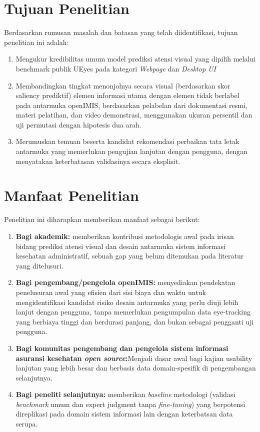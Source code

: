 \section{Tujuan Penelitian}


Berdasarkan rumusan masalah dan batasan yang telah diidentifikasi, tujuan penelitian ini adalah:

\begin{enumerate}
  \item Mengukur kredibilitas umum model prediksi atensi visual yang dipilih melalui benchmark publik UEyes pada kategori \textit{Webpage} dan \textit{Desktop UI}
  \item Membandingkan tingkat menonjolnya secara visual (berdasarkan skor saliency prediktif) elemen informasi utama dengan elemen tidak berlabel pada antarmuka openIMIS, berdasarkan pelabelan dari dokumentasi resmi, materi pelatihan, dan video demonstrasi, menggunakan ukuran persentil dan uji permutasi dengan hipotesis dua arah.
  \item Merumuskan temuan beserta kandidat rekomendasi perbaikan tata letak antarmuka yang memerlukan pengujian lanjutan dengan pengguna, dengan menyatakan keterbatasan validasinya secara eksplisit.
\end{enumerate}


\section{Manfaat Penelitian}


Penelitian ini diharapkan memberikan manfaat sebagai berikut:

\begin{enumerate}
  \item \textbf{Bagi akademik:} memberikan kontribusi metodologis awal pada irisan bidang prediksi atensi visual dan desain antarmuka sistem informasi kesehatan administratif, sebuah gap yang belum ditemukan pada literatur yang ditelusuri.
  \item \textbf{Bagi pengembang/pengelola openIMIS:} menyediakan pendekatan penelusuran awal yang efisien dari sisi biaya dan waktu untuk mengidentifikasi kandidat risiko desain antarmuka yang perlu diuji lebih lanjut dengan pengguna, tanpa memerlukan pengumpulan data eye-tracking yang berbiaya tinggi dan berdurasi panjang, dan bukan sebagai pengganti uji pengguna.
  \item \textbf{Bagi komunitas pengembang dan pengelola sistem informasi asuransi kesehatan \textit{open source}:}Menjadi dasar awal bagi kajian usability lanjutan yang lebih besar dan berbasis data domain-spesifik di pengembangan selanjutnya.
  \item \textbf{Bagi peneliti selanjutnya:} memberikan \textit{baseline} metodologi (validasi \textit{benchmark} umum dan expert judgment tanpa \textit{fine-tuning}) yang berpotensi direplikasi pada domain sistem informasi lain dengan keterbatsan data serupa. 
\end{enumerate}

